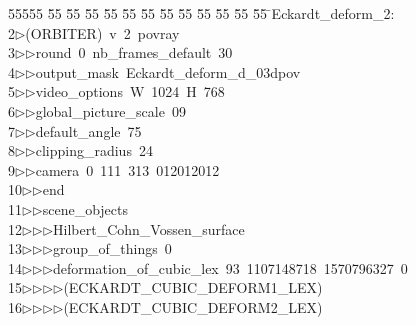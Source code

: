 %
%
\begin{tabbing}
55555 \= 55 \= 55 \= 55 \= 55 \= 55 \= 55 \= 55 \= 55 \= 55 \= 55 \= 55 \= 55 \= \>Eckardt\_deform\_2:\\[0pt]
2\>$\triangleright$\>(ORBITER)\ v\ 2\ povray\ \\[0pt]
3\>$\triangleright$\>$\triangleright$\>round\ 0\ nb\_frames\_default\ 30\ \\[0pt]
4\>$\triangleright$\>$\triangleright$\>output\_mask\ Eckardt\_deform\_d\_03dpov\ \\[0pt]
5\>$\triangleright$\>$\triangleright$\>video\_options\ W\ 1024\ H\ 768\ \\[0pt]
6\>$\triangleright$\>$\triangleright$\>global\_picture\_scale\ 09\ \\[0pt]
7\>$\triangleright$\>$\triangleright$\>default\_angle\ 75\ \\[0pt]
8\>$\triangleright$\>$\triangleright$\>clipping\_radius\ 24\ \\[0pt]
9\>$\triangleright$\>$\triangleright$\>camera\ 0\ 111\ 313\ 012012012\ \\[0pt]
10\>$\triangleright$\>$\triangleright$\>end\ \\[0pt]
11\>$\triangleright$\>$\triangleright$\>scene\_objects\ \\[0pt]
12\>$\triangleright$\>$\triangleright$\>$\triangleright$\>Hilbert\_Cohn\_Vossen\_surface\ \\[0pt]
13\>$\triangleright$\>$\triangleright$\>$\triangleright$\>group\_of\_things\ 0\ \\[0pt]
14\>$\triangleright$\>$\triangleright$\>$\triangleright$\>deformation\_of\_cubic\_lex\ 93\ 1107148718\ 1570796327\ 0\ \\[0pt]
15\>$\triangleright$\>$\triangleright$\>$\triangleright$\>$\triangleright$\>(ECKARDT\_CUBIC\_DEFORM1\_LEX)\ \\[0pt]
16\>$\triangleright$\>$\triangleright$\>$\triangleright$\>$\triangleright$\>(ECKARDT\_CUBIC\_DEFORM2\_LEX)\ \\[0pt]

\end{tabbing}
